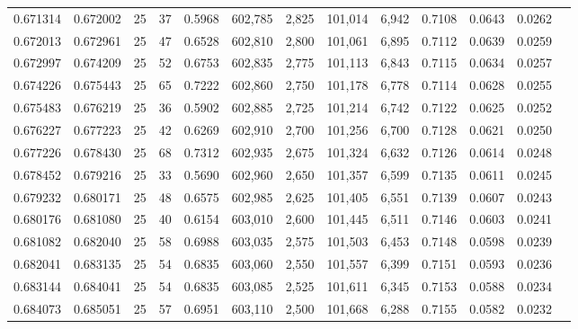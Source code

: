 \begin{tabular}{rrrrrrrrrrrrr}
0.671314 & 0.672002 &    25 &  37 &                                     0.5968 & 602,785 &   2,825 & 101,014 &   6,942 & 0.7108 & 0.0643 & 0.0262 \\
0.672013 & 0.672961 &    25 &  47 &                                     0.6528 & 602,810 &   2,800 & 101,061 &   6,895 & 0.7112 & 0.0639 & 0.0259 \\
0.672997 & 0.674209 &    25 &  52 &                                     0.6753 & 602,835 &   2,775 & 101,113 &   6,843 & 0.7115 & 0.0634 & 0.0257 \\
0.674226 & 0.675443 &    25 &  65 &                                     0.7222 & 602,860 &   2,750 & 101,178 &   6,778 & 0.7114 & 0.0628 & 0.0255 \\
0.675483 & 0.676219 &    25 &  36 &                                     0.5902 & 602,885 &   2,725 & 101,214 &   6,742 & 0.7122 & 0.0625 & 0.0252 \\
0.676227 & 0.677223 &    25 &  42 &                                     0.6269 & 602,910 &   2,700 & 101,256 &   6,700 & 0.7128 & 0.0621 & 0.0250 \\
0.677226 & 0.678430 &    25 &  68 &                                     0.7312 & 602,935 &   2,675 & 101,324 &   6,632 & 0.7126 & 0.0614 & 0.0248 \\
0.678452 & 0.679216 &    25 &  33 &                                     0.5690 & 602,960 &   2,650 & 101,357 &   6,599 & 0.7135 & 0.0611 & 0.0245 \\
0.679232 & 0.680171 &    25 &  48 &                                     0.6575 & 602,985 &   2,625 & 101,405 &   6,551 & 0.7139 & 0.0607 & 0.0243 \\
0.680176 & 0.681080 &    25 &  40 &                                     0.6154 & 603,010 &   2,600 & 101,445 &   6,511 & 0.7146 & 0.0603 & 0.0241 \\
0.681082 & 0.682040 &    25 &  58 &                                     0.6988 & 603,035 &   2,575 & 101,503 &   6,453 & 0.7148 & 0.0598 & 0.0239 \\
0.682041 & 0.683135 &    25 &  54 &                                     0.6835 & 603,060 &   2,550 & 101,557 &   6,399 & 0.7151 & 0.0593 & 0.0236 \\
0.683144 & 0.684041 &    25 &  54 &                                     0.6835 & 603,085 &   2,525 & 101,611 &   6,345 & 0.7153 & 0.0588 & 0.0234 \\
0.684073 & 0.685051 &    25 &  57 &                                     0.6951 & 603,110 &   2,500 & 101,668 &   6,288 & 0.7155 & 0.0582 & 0.0232 \\

\end{tabular}

